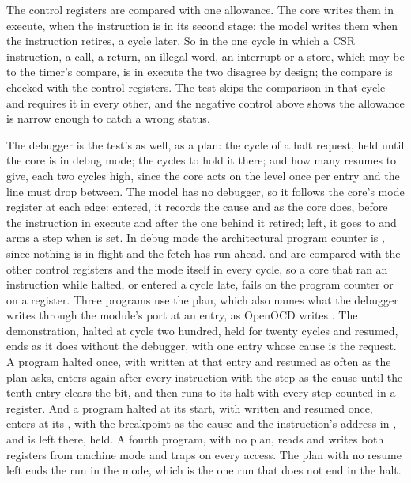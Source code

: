 \documentclass[journal,onecolumn,9pt]{IEEEtran}
\begin{document}
The control registers are compared with one allowance. The core
writes them in execute, when the instruction is in its second stage;
the model writes them when the instruction retires, a cycle later.
So in the one cycle in which a CSR instruction, a call, a return,
an illegal word, an interrupt or a store, which may be to the
timer's compare, is in execute the two disagree by design; the
compare is checked with the control registers. The test
skips the comparison in that cycle and requires it in every other,
and the negative control above shows the allowance is narrow enough
to catch a wrong status.

The debugger is the test's as well, as a plan: the cycle of a halt
request, held until the core is in debug mode; the cycles to hold it
there; and how many resumes to give, each two cycles high, since the
core acts on the level once per entry and the line must drop between.
The model has no debugger, so it follows the core's mode register at
each edge: entered, it records the cause and  as the core
does, before the instruction in execute and after the one behind it
retired; left, it goes to  and arms a step when
 is set. In debug mode the architectural program
counter is , since nothing is in flight and the fetch has
run ahead.  and  are compared with the other
control registers and the mode itself in every cycle, so a core that
ran an instruction while halted, or entered a cycle late, fails on
the program counter or on a register. Three programs use the plan,
which also names what the debugger writes through the module's port
at an entry, as OpenOCD writes .
The demonstration, halted at cycle two hundred, held for twenty
cycles and resumed, ends as it does without the debugger, with one
entry whose cause is the request. A program halted once, with
 written at that entry and resumed as often as the
plan asks, enters again after every instruction with the step as the
cause until the tenth entry clears the bit, and then runs to its halt
with every step counted in a register. And a program halted at its
start, with  written and resumed once, enters
at its , with the breakpoint as the cause and the
instruction's address in , and is left there, held. A
fourth program, with no plan, reads and writes both registers from
machine mode and traps on every access. The plan with no resume left ends the run in the
mode, which is the one run that does not end in the halt.
\end{document}
